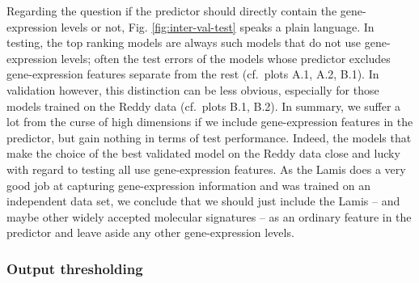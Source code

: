 Regarding the question if the predictor should directly contain the gene-expression levels or not,
Fig. \ref{fig:inter-val-test} speaks a plain language. In testing, the top ranking models are 
always such models that do not use gene-expression levels; often the test errors of the models whose 
predictor excludes gene-expression features separate from the rest (cf.\ plots A.1, A.2, B.1). In 
validation however, this distinction can be less obvious, especially for those models trained on 
the Reddy data (cf.\ plots B.1, B.2). In summary, we suffer a lot from the curse of high dimensions 
if we include gene-expression features in the predictor, but gain nothing in terms of test 
performance. Indeed, the models that make the choice of the best validated model on the Reddy data 
close and lucky with regard to testing all use gene-expression features. As the Lamis does a very 
good job at capturing gene-expression information and was trained on an independent data set, we 
conclude that we should just include the Lamis -- and maybe other widely accepted molecular 
signatures -- as an ordinary feature in the predictor and leave aside any other gene-expression 
levels.

\subsubsection{Output thresholding}